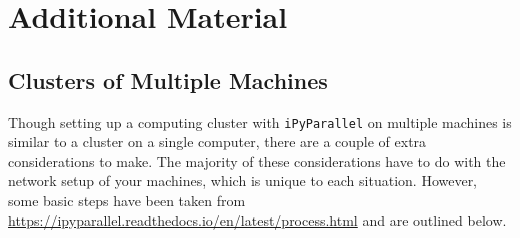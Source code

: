 %
%
%
%

\newpage
\section*{Additional Material}

\begin{comment} %
\subsection*{Installation and Initialization}


\end{comment}

\subsection*{Clusters of Multiple Machines}

Though setting up a computing cluster with \texttt{iPyParallel} on multiple machines is similar to a cluster on a single computer, there are a couple of extra considerations to make.
The majority of these considerations have to do with the network setup of your machines, which is unique to each situation.
However, some basic steps have been taken from \url{https://ipyparallel.readthedocs.io/en/latest/process.html} and are outlined below.

